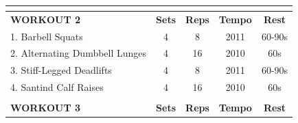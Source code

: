\begin{itemize}
\begin{table}
{\begin{tabular}{|l|c|c|c|c|}
				\hline
				\multicolumn{5}{|c|}{{\cellcolor[rgb]{0.753,0.753,0.753}}}                                                                                                                                                                                                                                                    \\ 
				\hline
				\textbf{WORKOUT 2}                                                                                  & \textbf{Sets}                                & \textbf{Reps}                                    & \textbf{Tempo}                                     & \textbf{Rest}                                    \\ 
				\hline
				1. Barbell Squats                                                                                   & 4                                            & 8                                                & 2011                                               & 60-90s                                           \\ 
				\hline
				2. Alternating Dumbbell Lunges                                                                      & 4                                            & 16                                               & 2010                                               & 60s                                              \\ 
				\hline
				3. Stiff-Legged Deadlifts                                                                           & 4                                            & 8                                                & 2011                                               & 60-90s                                           \\ 
				\hline
				4. Santind Calf Raises                                                                              & 4                                            & 16                                               & 2010                                               & 60s                                              \\ 
				\hline
				\multicolumn{5}{|l|}{{\cellcolor[rgb]{0.753,0.753,0.753}}}                                                                                                                                                                                                                                                    \\ 
				\hline
				\textbf{WORKOUT 3}                                                                                  & \textbf{Sets}                                & \textbf{Reps}                                    & \textbf{Tempo}                                     & \textbf{Rest}                                    \\ 

\end{tabular}}
\end{table}
\end{itemize}
